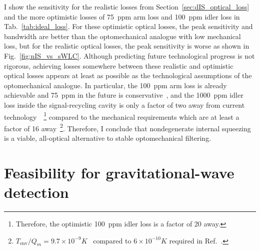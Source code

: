 I show the sensitivity for the realistic losses from Section~\ref{sec:dIS_optical_loss} and the more optimistic losses of 75~ppm arm loss and 100~ppm idler loss in Tab.~\ref{tab:ideal_loss}. For these optimistic optical losses, the peak sensitivity and bandwidth are better than the optomechanical analogue with low mechanical loss, but for the realistic optical losses, the peak sensitivity is worse as shown in Fig.~\ref{fig:nIS_vs_sWLC}. Although predicting future technological progress is not rigorous, achieving losses somewhere between these realistic and optimistic optical losses appears at least as possible as the technological assumptions of the optomechanical analogue. In particular, the 100~ppm arm loss is already achievable and 75~ppm in the future is conservative~\cite{hardwick_2019}, and the 1000~ppm idler loss inside the signal-recycling cavity is only a factor of two away from current technology~\cite{barsottiLIGOdoc2016}~\footnote{Therefore, the optimistic 100~ppm idler loss is a factor of 20 away.} compared to the mechanical requirements which are at least a factor of 16 away~\footnote{$T_\text{env}/Q_m=9.7\times 10^{-9} K$~\cite{masonetal2019} compared to $6\times 10^{-10}K$ required in Ref.~\cite{miaoEnhancingBandwidthGravitationalWave2015}.}.
Therefore, I conclude that nondegenerate internal squeezing is a viable, all-optical alternative to stable optomechanical filtering. %



\section{Feasibility for gravitational-wave detection}
\label{sec:nIS_sigRO_feasibility}

